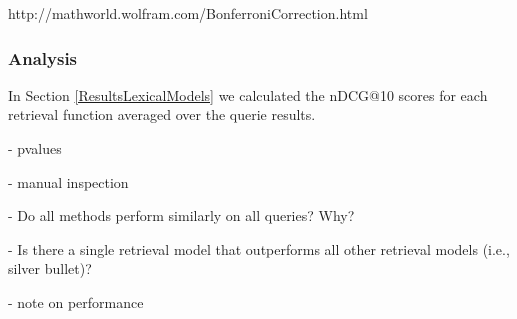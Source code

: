 http://mathworld.wolfram.com/BonferroniCorrection.html

\subsubsection{Analysis}
\label{AnalysisLexicalModels}






In Section \ref{ResultsLexicalModels} we calculated the nDCG@10 scores for each retrieval function averaged over the querie results.



- pvalues

- manual inspection




- Do all methods perform similarly on all queries? Why?

- Is there a single retrieval model that outperforms all other retrieval models (i.e., silver bullet)?

- note on performance